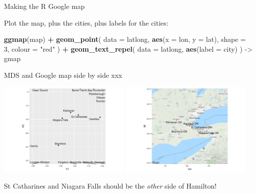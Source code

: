 \documentclass[ignorenonframetext,]{beamer}
\newenvironment{Shaded}{\begin{snugshade}}{\end{snugshade}}
\newcommand{\DataTypeTok}[1]{\textcolor[rgb]{0.13,0.29,0.53}{#1}}
\newcommand{\DecValTok}[1]{\textcolor[rgb]{0.00,0.00,0.81}{#1}}
\newcommand{\KeywordTok}[1]{\textcolor[rgb]{0.13,0.29,0.53}{\textbf{#1}}}
\newcommand{\NormalTok}[1]{#1}
\newcommand{\OperatorTok}[1]{\textcolor[rgb]{0.81,0.36,0.00}{\textbf{#1}}}
\newcommand{\StringTok}[1]{\textcolor[rgb]{0.31,0.60,0.02}{#1}}
\begin{document}
\begin{frame}[fragile]{Making the R Google map}
\protect\hypertarget{making-the-r-google-map}{}

Plot the map, plus the cities, plus labels for the cities:

\begin{Shaded}
\begin{Highlighting}[]
\KeywordTok{ggmap}\NormalTok{(map) }\OperatorTok{+}
\StringTok{  }\KeywordTok{geom_point}\NormalTok{(}
    \DataTypeTok{data =}\NormalTok{ latlong,}
    \KeywordTok{aes}\NormalTok{(}\DataTypeTok{x =}\NormalTok{ lon, }\DataTypeTok{y =}\NormalTok{ lat),}
    \DataTypeTok{shape =} \DecValTok{3}\NormalTok{, }\DataTypeTok{colour =} \StringTok{"red"}
\NormalTok{  ) }\OperatorTok{+}
\StringTok{  }\KeywordTok{geom_text_repel}\NormalTok{(}
    \DataTypeTok{data =}\NormalTok{ latlong,}
    \KeywordTok{aes}\NormalTok{(}\DataTypeTok{label =}\NormalTok{ city)}
\NormalTok{  ) ->}\StringTok{ }\NormalTok{gmap}
\end{Highlighting}
\end{Shaded}

\end{frame}

\begin{frame}{MDS and Google map side by side xxx}
\protect\hypertarget{mds-and-google-map-side-by-side-xxx}{}

\includegraphics[width=0.48\textwidth,height=\textheight]{g2.png}
\includegraphics[width=0.48\textwidth,height=\textheight]{gmap.png}

St Catharines and Niagara Falls should be the \emph{other} side of
Hamilton!

\end{frame}
\end{document}
